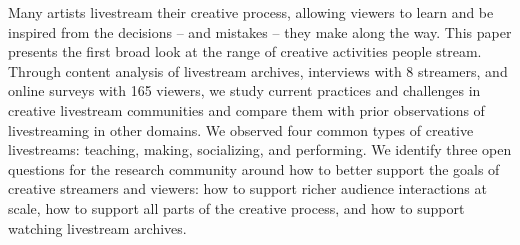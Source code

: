 Many artists livestream their creative process, allowing viewers to learn and be inspired from the decisions -- and mistakes -- they make along the way. This paper presents the first broad look at the range of creative activities people stream. Through content analysis of livestream archives, interviews with 8 streamers, and online surveys with 165 viewers, we study current practices and challenges in creative livestream communities and compare them with prior observations of livestreaming in other domains. We observed four common types of creative livestreams: teaching, making, socializing, and performing. We identify three open questions for the research community around how to better support the goals of creative streamers and viewers: how to support richer audience interactions at scale, how to support all parts of the creative process, and how to support watching livestream archives.


